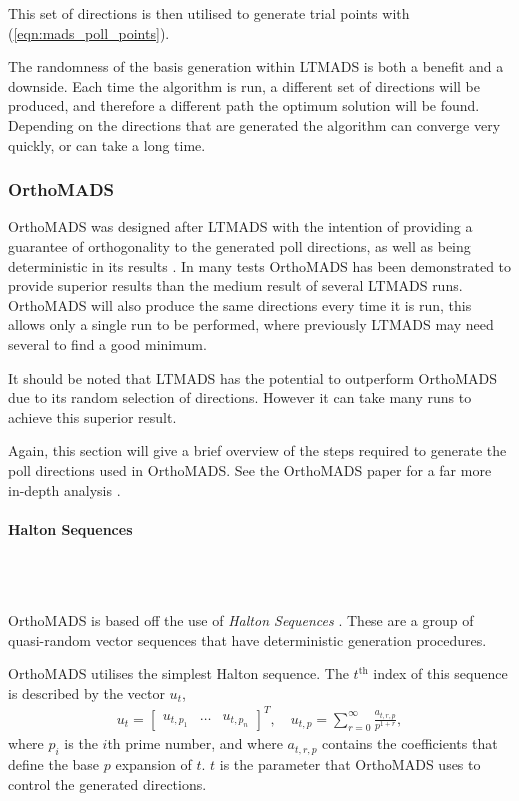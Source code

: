 This set of directions is then utilised to generate trial points with (\ref{eqn:mads_poll_points}).

The randomness of the basis generation within \ac{LTMADS} is both a benefit and a downside. Each time the algorithm is run, a different set of directions will be produced, and therefore a different path the optimum solution will be found. Depending on the directions that are generated the algorithm can converge very quickly, or can take a long time.

\subsubsection{OrthoMADS}\label{subsub:orthomads_algo}

\ac{OrthoMADS} was designed after \ac{LTMADS} with the intention of providing a guarantee of orthogonality to the generated poll directions, as well as being deterministic in its results \cite{Abramson2009Orthomads:Ions}. In many tests \ac{OrthoMADS} has been demonstrated to provide superior results than the medium result of several \ac{LTMADS} runs. \ac{OrthoMADS} will also produce the same directions every time it is run, this allows only a single run to be performed, where previously \ac{LTMADS} may need several to find a good minimum. 

It should be noted that \ac{LTMADS} has the potential to outperform \ac{OrthoMADS} due to its random selection of directions. However it can take many runs to achieve this superior result.

Again, this section will give a brief overview of the steps required to generate the poll directions used in \ac{OrthoMADS}. See the \ac{OrthoMADS} paper for a far more in-depth analysis \cite{Abramson2009Orthomads:Ions}. 


\paragraph{Halton Sequences}\\\

\ac{OrthoMADS} is based off the use of \textit{Halton Sequences} \cite{HaltonOnIntegrals}. These are a group of quasi-random vector sequences that have deterministic generation procedures. 

\ac{OrthoMADS} utilises the simplest Halton sequence. The $t^\text{th}$ index of this sequence is described by the vector $u_t$,
\begin{gather}\label{eqn:halton_sequence}
    u_t = \begin{bmatrix} u_{t,p_1} & \ldots & u_{t,p_n} \end{bmatrix}^T, \quad
    u_{t,p} = \sum^\infty_{r=0}\frac{a_{t,r,p}}{p^{1+r}},
\end{gather}
where $p_i$ is the $i$th prime number, and where $a_{t,r,p}$ contains the coefficients that define the base $p$ expansion of $t$. $t$ is the parameter that \ac{OrthoMADS} uses to control the generated directions.


